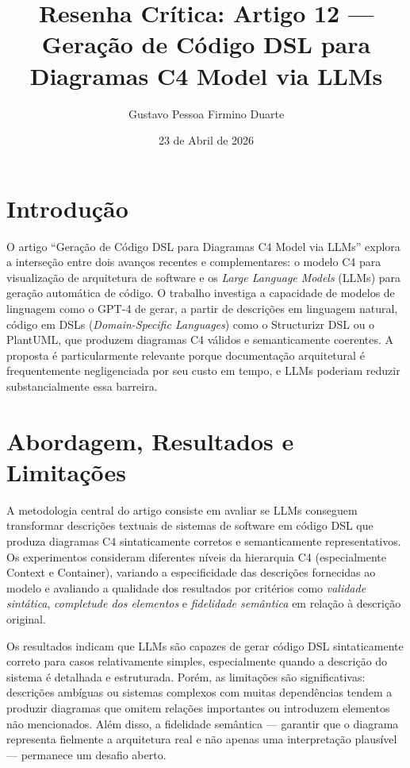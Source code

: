 \documentclass[12pt,a4paper]{article}
\title{Resenha Cr\'itica: Artigo 12 ---\\
Gera\c{c}\~ao de C\'odigo DSL para Diagramas C4 Model via LLMs}
\author{Gustavo Pessoa Firmino Duarte}
\date{23 de Abril de 2026}
\begin{document}
\maketitle

\section{Introdu\c{c}\~ao}

O artigo ``Gera\c{c}\~ao de C\'odigo DSL para Diagramas C4 Model via LLMs''
explora a interseção entre dois avan\c{c}os recentes e complementares: o modelo
C4 para visualiza\c{c}\~ao de arquitetura de software e os \textit{Large Language
Models} (LLMs) para gera\c{c}\~ao autom\'atica de c\'odigo. O trabalho investiga
a capacidade de modelos de linguagem como o GPT-4 de gerar, a partir de descri\c{c}\~oes
em linguagem natural, c\'odigo em DSLs (\textit{Domain-Specific Languages}) como
o Structurizr DSL ou o PlantUML, que produzem diagramas C4 v\'alidos e semanticamente
coerentes. A proposta \'e particularmente relevante porque documenta\c{c}\~ao
arquitetural \'e frequentemente negligenciada por seu custo em tempo, e LLMs
poderiam reduzir substancialmente essa barreira.

\section{Abordagem, Resultados e Limita\c{c}\~oes}

A metodologia central do artigo consiste em avaliar se LLMs conseguem transformar
descri\c{c}\~oes textuais de sistemas de software em c\'odigo DSL que produza
diagramas C4 sintaticamente corretos e semanticamente representativos. Os
experimentos consideram diferentes n\'iveis da hierarquia C4 (especialmente
Context e Container), variando a especificidade das descri\c{c}\~oes fornecidas
ao modelo e avaliando a qualidade dos resultados por crit\'erios como
\textit{validade sint\'atica}, \textit{completude dos elementos} e \textit{fidelidade
sem\^antica} em rela\c{c}\~ao \`a descri\c{c}\~ao original.

Os resultados indicam que LLMs s\~ao capazes de gerar c\'odigo DSL sintaticamente
correto para casos relativamente simples, especialmente quando a descri\c{c}\~ao
do sistema \'e detalhada e estruturada. Por\'em, as limita\c{c}\~oes s\~ao
significativas: descri\c{c}\~oes amb\'iguas ou sistemas complexos com muitas
depend\^encias tendem a produzir diagramas que omitem rela\c{c}\~oes importantes
ou introduzem elementos n\~ao mencionados. Al\'em disso, a fidelidade sem\^antica
---  garantir que o diagrama representa fielmente a arquitetura real e n\~ao apenas
uma interpreta\c{c}\~ao plaus\'ivel --- permanece um desafio aberto.
\end{document}
